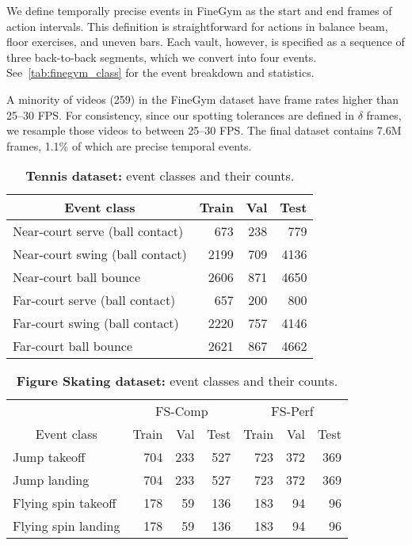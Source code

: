 \documentclass[runningheads]{llncs}
\newcommand{\notation}[1]{\ensuremath{#1}\xspace}
\newcommand{\fscomp}{{FS-Comp}\xspace}
\newcommand{\fsperf}{{FS-Perf}\xspace}
\newcommand{\finegym}{{FineGym}\xspace}
\newcommand{\Tolerance}{\notation{\delta}}
\begin{document}
We define temporally precise events in \finegym as the start and end frames of action intervals.
This definition is straightforward for actions in balance beam, floor exercises, and uneven bars.
Each vault, however, is specified as a sequence of three back-to-back segments, which we convert into four events.
See~\autoref{tab:finegym_class} for the event breakdown and statistics.

A minority of videos (259) in the \finegym dataset have frame rates higher than 25--30 FPS.
For consistency, since our spotting tolerances are defined in \Tolerance frames, we resample those videos to between 25--30 FPS.
The final dataset contains 7.6M frames, 1.1\% of which are precise temporal events.

\begin{table}[p]
    \centering
    \caption{{\bf Tennis dataset:} event classes and their counts.}
    \label{tab:tennis_class}
    {
    \begin{tabularx}{0.605\columnwidth}{lrrr}
        \toprule
        \multicolumn{1}{c}{Event class} & Train & Val & Test \\
        \midrule
        Near-court serve (ball contact)
            & 673 & 238 & 779 \\
        Near-court swing (ball contact)
            & 2199 & 709 & 4136 \\
        Near-court ball bounce
            & 2606 & 871 & 4650 \\
        Far-court serve (ball contact)
            & 657 & 200 & 800 \\
        Far-court swing (ball contact)
            & 2220 & 757 & 4146 \\
        Far-court ball bounce
            & 2621 & 867 & 4662 \\
        \bottomrule
    \end{tabularx}
    }
\end{table}

\begin{table}[p]
    \centering
    \caption{{\bf Figure Skating dataset:} event classes and their counts.}
    \label{tab:fs_class}
    {
    \begin{tabularx}{0.68\columnwidth}{lrrrrrr}
        \toprule
            & \multicolumn{3}{c}{\fscomp} & \multicolumn{3}{c}{\fsperf} \\
        \multicolumn{1}{c}{Event class}
            & Train & Val & Test
            & Train & Val & Test \\
        \midrule
        Jump takeoff
            & 704 & 233 & 527
            & 723 & 372 & 369 \\
        Jump landing
            & 704 & 233 & 527
            & 723 & 372 & 369 \\
        Flying spin takeoff
            & 178 & 59 & 136
            & 183 & 94 & 96 \\
        Flying spin landing
            & 178 & 59 & 136
            & 183 & 94 & 96 \\
        \bottomrule
    \end{tabularx}
    }
\end{table}
\end{document}

